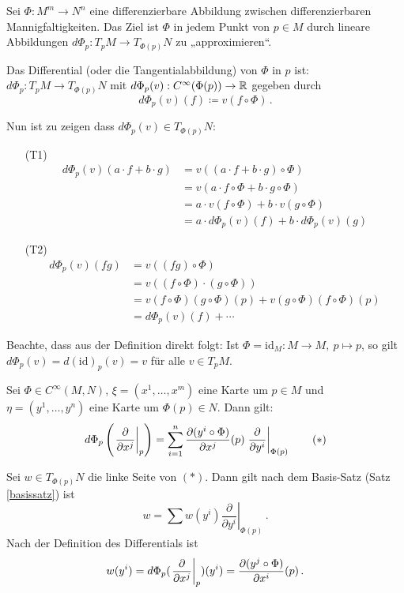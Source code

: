 \documentclass[a4paper,twoside,DIV15,BCOR12mm]{scrbook}
\renewcommand{\da}{\coloneqq}
\begin{document}
Sei $\Phi:M^m\to N^n$ eine differenzierbare Abbildung zwischen differenzierbaren Mannigfaltigkeiten. Das Ziel ist $\Phi$ in jedem Punkt von $p\in M$ durch lineare Abbildungen $d\Phi_p: T_pM \to T_{\Phi(p)}N$ zu „approximieren“. 

\begin{definition}
Das Differential (oder die Tangentialabbildung) von $\Phi$ in $p$ ist:
$ d\Phi_p : T_pM \to T_{\Phi(p)}N $ mit $d\Phi_p(v) : C^\infty(\Phi(p)) \to \mathbb{R}$ gegeben durch
\[ d\Phi_p(v)(f) \da v(f \circ \Phi)\,. \]
\end{definition}

Nun ist zu zeigen dass $d\Phi_p(v) \in T_{\Phi(p)}N$:
\begin{itemize}
\item[(T1)]
\begin{align*}
d\Phi_p(v)(a\cdot f + b\cdot g) 
&= v( (a\cdot f+b\cdot g) \circ \Phi) \\
&=v(a\cdot f \circ \Phi + b\cdot g \circ \Phi) \\
&=a\cdot v(f\circ \Phi) + b\cdot v(g\circ \Phi) \\
&=a\cdot d\Phi_p(v)(f) + b\cdot d\Phi_p(v)(g)
\end{align*}
\item[(T2)]
\begin{align*}
d\Phi_p(v)(fg) 
&= v( (fg)\circ \Phi) \\
&= v( (f\circ \Phi)\cdot(g\circ\Phi) ) \\
&= v(f\circ \Phi)(g\circ \Phi)(p) + v(g\circ \Phi)(f\circ \Phi)(p) \\
&= d\Phi_p(v)(f) + \cdots 
\end{align*}
\end{itemize}

Beachte, dass aus der Definition direkt folgt: Ist $\Phi = \text{id}_M: M\to M,\> p\mapsto p$, so gilt $d\Phi_p(v) = d(\text{id})_p(v) = v$ für alle $v\in T_pM$.

\begin{lemma}
\label{lem3}
Sei $\Phi \in C^\infty(M,N)$, $\xi = (x^1,\ldots,x^m)$ eine Karte um $p\in M$ und $\eta = (y^1,\ldots,y^n)$ eine Karte um $\Phi(p)\in N$. Dann gilt:
\[
d\Phi_p\left(\left.\frac{\partial}{\partial x^{j}}\right|_p\right) = \sum_{i=1}^n \frac{ \partial(y^i\circ \Phi)}{\partial x^j}(p) \left.\frac{\partial}{\partial y^i}\right|_{\Phi(p)} \qquad (*)
\]
\end{lemma}

\begin{beweis}
Sei $w\in T_{\Phi(p)}N$ die linke Seite von $(*)$. Dann gilt nach dem Basis-Satz (Satz \ref{basissatz}) ist 
\[ w = \sum w(y^i) \left.\frac{\partial}{\partial y^i}\right|_{\Phi(p)}\,.\]
Nach der Definition des Differentials ist
\[ w(y^i) = d\Phi_p(\left.\frac{\partial}{\partial x^{j}}\right|_p)(y^i) = \frac{\partial(y^j\circ \Phi)}{\partial x^i}(p)\,.\]
\end{beweis}
\end{document}
